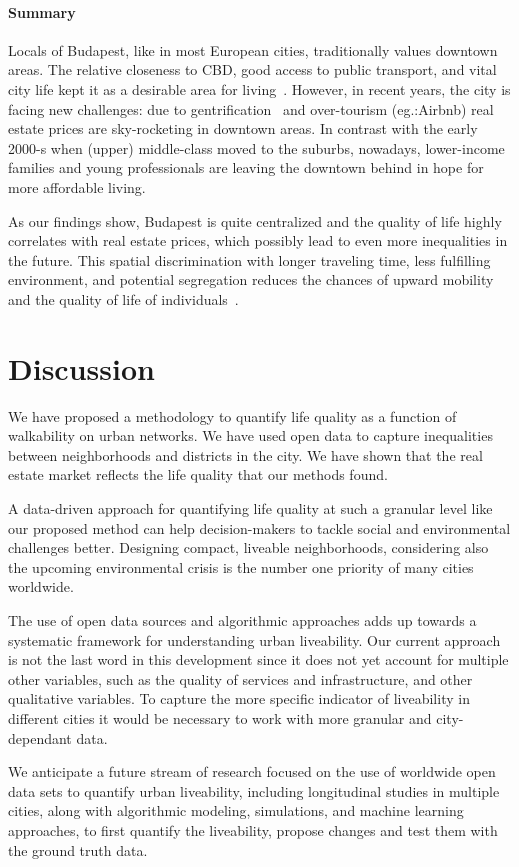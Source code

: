 \paragraph{Summary} Locals of Budapest, like in most European cities, traditionally values downtown areas. The relative closeness to CBD, good access to public transport, and vital city life kept it as a desirable area for living~\cite{Cassiers2012Socio}. However, in recent years, the city is facing new challenges: due to gentrification~\cite{Garcia2004Cultural} and over-tourism (eg.:Airbnb) real estate prices are sky-rocketing in downtown areas. In contrast with the early 2000-s when (upper) middle-class moved to the suburbs, nowadays, lower-income families and young professionals are leaving the downtown behind in hope for more affordable living.

As our findings show, Budapest is quite centralized and the quality of life highly correlates with real estate prices, which possibly lead to even more inequalities in the future. This spatial discrimination with longer traveling time, less fulfilling environment, and potential segregation reduces the chances of upward mobility and the quality of life of individuals~\cite{Gobillon2007Mechanisms}.

\section{Discussion}
We have proposed a methodology to quantify life quality as a function of walkability on urban networks. We have used open data to capture inequalities between neighborhoods and districts in the city. We have shown that the real estate market reflects the life quality that our methods found.

A data-driven approach for quantifying life quality at such a granular level like our proposed method can help decision-makers to tackle social and environmental challenges better. Designing compact, liveable neighborhoods, considering also the upcoming environmental crisis is the number one priority of many cities worldwide.

The use of open data sources and algorithmic approaches adds up towards a systematic framework for understanding urban liveability. Our current approach is not the last word in this development since it does not yet account for multiple other variables, such as the quality of services and infrastructure, and other qualitative variables. To capture the more specific indicator of liveability in different cities it would be necessary to work with more granular and city-dependant data.

We anticipate a future stream of research focused on the use of worldwide open data sets to quantify urban liveability, including longitudinal studies in multiple cities, along with algorithmic modeling, simulations, and machine learning approaches, to first quantify the liveability, propose changes and test them with the ground truth data.
